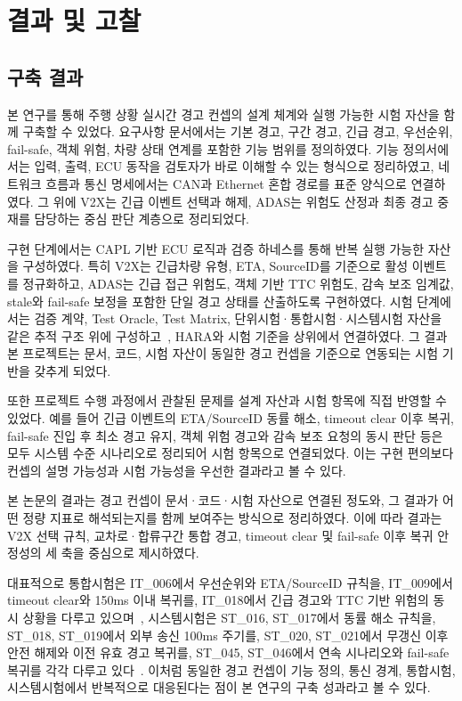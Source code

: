 \documentclass[11pt,a4paper]{article}
\begin{document}
\section{결과 및 고찰}

\subsection{구축 결과}

본 연구를 통해 주행 상황 실시간 경고 컨셉의 설계 체계와 실행 가능한 시험 자산을 함께 구축할 수 있었다. 요구사항 문서에서는 기본 경고, 구간 경고, 긴급 경고, 우선순위, fail-safe, 객체 위험, 차량 상태 연계를 포함한 기능 범위를 정의하였다. 기능 정의서에서는 입력, 출력, ECU 동작을 검토자가 바로 이해할 수 있는 형식으로 정리하였고, 네트워크 흐름과 통신 명세에서는 CAN과 Ethernet 혼합 경로를 표준 양식으로 연결하였다. 그 위에 V2X는 긴급 이벤트 선택과 해제, ADAS는 위험도 산정과 최종 경고 중재를 담당하는 중심 판단 계층으로 정리되었다.

구현 단계에서는 CAPL 기반 ECU 로직과 검증 하네스를 통해 반복 실행 가능한 자산을 구성하였다. 특히 V2X는 긴급차량 유형, ETA, SourceID를 기준으로 활성 이벤트를 정규화하고, ADAS는 긴급 접근 위험도, 객체 기반 TTC 위험도, 감속 보조 임계값, stale와 fail-safe 보정을 포함한 단일 경고 상태를 산출하도록 구현하였다. 시험 단계에서는 검증 계약, Test Oracle, Test Matrix, 단위시험·통합시험·시스템시험 자산을 같은 추적 구조 위에 구성하고~\cite{suite_policy}, HARA와 시험 기준을 상위에서 연결하였다. 그 결과 본 프로젝트는 문서, 코드, 시험 자산이 동일한 경고 컨셉을 기준으로 연동되는 시험 기반을 갖추게 되었다.

또한 프로젝트 수행 과정에서 관찰된 문제를 설계 자산과 시험 항목에 직접 반영할 수 있었다. 예를 들어 긴급 이벤트의 ETA/SourceID 동률 해소, timeout clear 이후 복귀, fail-safe 진입 후 최소 경고 유지, 객체 위험 경고와 감속 보조 요청의 동시 판단 등은 모두 시스템 수준 시나리오로 정리되어 시험 항목으로 연결되었다. 이는 구현 편의보다 컨셉의 설명 가능성과 시험 가능성을 우선한 결과라고 볼 수 있다.

본 논문의 결과는 경고 컨셉이 문서·코드·시험 자산으로 연결된 정도와, 그 결과가 어떤 정량 지표로 해석되는지를 함께 보여주는 방식으로 정리하였다. 이에 따라 결과는 V2X 선택 규칙, 교차로·합류구간 통합 경고, timeout clear 및 fail-safe 이후 복귀 안정성의 세 축을 중심으로 제시하였다.

대표적으로 통합시험은 IT\_006에서 우선순위와 ETA/SourceID 규칙을, IT\_009에서 timeout clear와 150ms 이내 복귀를, IT\_018에서 긴급 경고와 TTC 기반 위험의 동시 상황을 다루고 있으며~\cite{integration_test}, 시스템시험은 ST\_016, ST\_017에서 동률 해소 규칙을, ST\_018, ST\_019에서 외부 송신 100ms 주기를, ST\_020, ST\_021에서 무갱신 이후 안전 해제와 이전 유효 경고 복귀를, ST\_045, ST\_046에서 연속 시나리오와 fail-safe 복귀를 각각 다루고 있다~\cite{system_test}. 이처럼 동일한 경고 컨셉이 기능 정의, 통신 경계, 통합시험, 시스템시험에서 반복적으로 대응된다는 점이 본 연구의 구축 성과라고 볼 수 있다.
\end{document}
